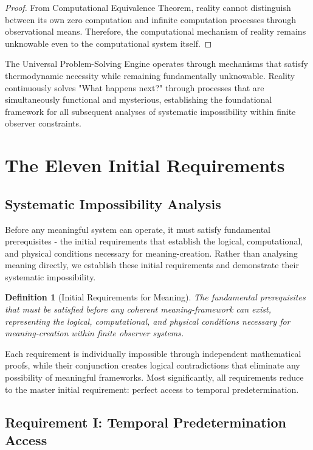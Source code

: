 \documentclass[12pt,a4paper]{article}
\newtheorem{definition}[theorem]{Definition}
\begin{document}
\begin{proof}
From Computational Equivalence Theorem, reality cannot distinguish between its own zero computation and infinite computation processes through observational means. Therefore, the computational mechanism of reality remains unknowable even to the computational system itself.
\end{proof}

The Universal Problem-Solving Engine operates through mechanisms that satisfy thermodynamic necessity while remaining fundamentally unknowable. Reality continuously solves "What happens next?" through processes that are simultaneously functional and mysterious, establishing the foundational framework for all subsequent analyses of systematic impossibility within finite observer constraints.

\section{The Eleven Initial Requirements}

\subsection{Systematic Impossibility Analysis}

Before any meaningful system can operate, it must satisfy fundamental prerequisites - the initial requirements that establish the logical, computational, and physical conditions necessary for meaning-creation. Rather than analysing meaning directly, we establish these initial requirements and demonstrate their systematic impossibility.

\begin{definition}[Initial Requirements for Meaning]
The fundamental prerequisites that must be satisfied before any coherent meaning-framework can exist, representing the logical, computational, and physical conditions necessary for meaning-creation within finite observer systems.
\end{definition}

Each requirement is individually impossible through independent mathematical proofs, while their conjunction creates logical contradictions that eliminate any possibility of meaningful frameworks. Most significantly, all requirements reduce to the master initial requirement: perfect access to temporal predetermination.

\subsection{Requirement I: Temporal Predetermination Access}
\end{document}
